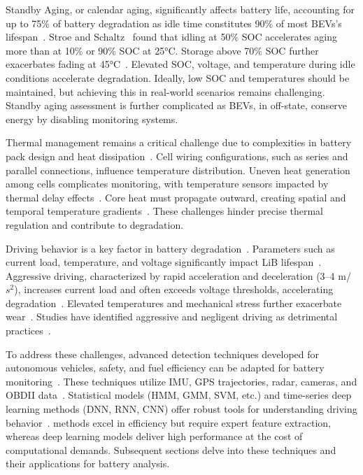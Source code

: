 Standby Aging, or calendar aging, significantly affects battery life, accounting for up to 75\% of battery degradation as idle time constitutes 90\% of most \glspl{BEV}'s lifespan~\cite{EDDAHECH20122438,7045522}. 
Stroe and Schaltz~\cite{8911243} found that idling at 50\% \gls{SOC} accelerates aging more than at 10\% or 90\% \gls{SOC} at 25°C. Storage above 70\% \gls{SOC} further exacerbates fading at 45°C~\cite{BANK2020228566}. 
Elevated \gls{SOC}, voltage, and temperature during idle conditions accelerate degradation. 
Ideally, low \gls{SOC} and temperatures should be maintained, but achieving this in real-world scenarios remains challenging. 
Standby aging assessment is further complicated as \glspl{BEV}, in off-state, conserve energy by disabling monitoring systems.

Thermal management remains a critical challenge due to complexities in battery pack design and heat dissipation~\cite{wang2016critical}. 
Cell wiring configurations, such as series and parallel connections, influence temperature distribution. 
Uneven heat generation among cells complicates monitoring, with temperature sensors impacted by thermal delay effects~\cite{TALELE2021103482}. 
Core heat must propagate outward, creating spatial and temporal temperature gradients~\cite{wang2020study,chiu2014cycle}. 
These challenges hinder precise thermal regulation and contribute to degradation.

Driving behavior is a key factor in battery degradation~\cite{donkers2020influence}. 
Parameters such as current load, temperature, and voltage significantly impact \gls{LiB} lifespan~\cite{tremblay2009experimental,trippe2014charging,keil2016calendar}. 
Aggressive driving, characterized by rapid acceleration and deceleration (3–4 m/$s^2$), increases current load and often exceeds voltage thresholds, accelerating degradation~\cite{wang2018battery}. 
Elevated temperatures and mechanical stress further exacerbate wear~\cite{han2019review}. Studies have identified aggressive and negligent driving as detrimental practices~\cite{Alkinani2020}.

To address these challenges, advanced detection techniques developed for autonomous vehicles, safety, and fuel efficiency can be adapted for battery monitoring~\cite{Manzoni2010,Wang2022,autodrive2021}. 
These techniques utilize \gls{IMU}, \gls{GPS} trajectories, radar, cameras, and \gls{OBDII} data~\cite{Monselise2022,Zhy2022,WangJ2022,Zhu2022}. 
Statistical models (\gls{HMM}, \gls{GMM}, \gls{SVM}, etc.) and time-series deep learning methods (\gls{DNN}, \gls{RNN}, \gls{CNN}) offer robust tools for understanding driving behavior~\cite{deng2021review}. 
methods excel in efficiency but require expert feature extraction, whereas deep learning models deliver high performance at the cost of computational demands. 
Subsequent sections delve into these techniques and their applications for battery analysis.


